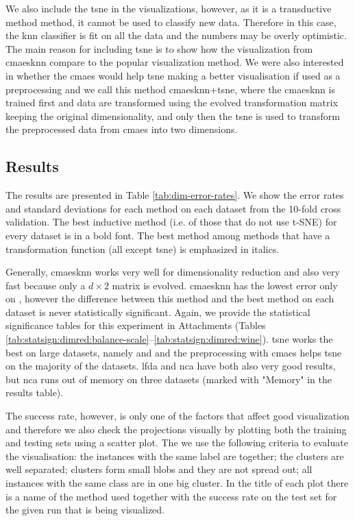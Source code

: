 \documentclass[12pt,a4paper]{report}
\begin{document}
We also include the \ac{tsne} in the visualizations, however, as it is a transductive method method, it cannot be used to classify new data. Therefore in this case, the \ac{knn} classifier is fit on all the data and the numbers may be overly optimistic. The main reason for including \ac{tsne} is to show how the visualization from \ac{cmaesknn} compare to the popular visualization method. We were also interested in whether the \ac{cmaes} would help \ac{tsne} making a better visualisation if used as a preprocessing and we call this method \ac{cmaesknn}+\ac{tsne}, where the \ac{cmaesknn} is trained first and data are transformed using the evolved transformation matrix keeping the original dimensionality, and only then the \ac{tsne} is used to transform the preprocessed data from \ac{cmaes} into two dimensions.

\subsection{Results}

The results are presented in Table \ref{tab:dim-error-rates}. We show the error rates and standard deviations for each method on each dataset from the 10-fold cross validation. The best inductive method (i.e. of those that do not use t-SNE) for every dataset is in a bold font. The best method among methods that have a transformation function (all except \ac{tsne}) is emphasized in italics.

Generally, \ac{cmaesknn} works very well for dimensionality reduction and also very fast because only a $d\times2$ matrix is evolved. \ac{cmaesknn} has the lowest error only on , however the difference between this method and the best method on each dataset is never statistically significant. Again, we provide the statistical significance tables for this experiment in Attachments (Tables \ref{tab:statsign:dimred:balance-scale}--\ref{tab:statsign:dimred:wine}). \ac{tsne} works the best on large datasets, namely  and  and the preprocessing with \ac{cmaes} helps \ac{tsne} on the majority of the datasets. \ac{lfda} and \ac{nca} have both also very good results, but \ac{nca} runs out of memory on three datasets (marked with "Memory" in the results table).



The success rate, however, is only one of the factors that affect good visualization and therefore we also check the projections visually by plotting both the training and testing sets using a scatter plot. The we use the following criteria to evaluate the visualisation: the instances with the same label are together; the clusters are well separated; clusters form small blobs and they are not spread out; all instances with the same class are in one big cluster. In the title of each plot there is a name of the method used together with the success rate on the test set for the given run that is being visualized.
\end{document}
